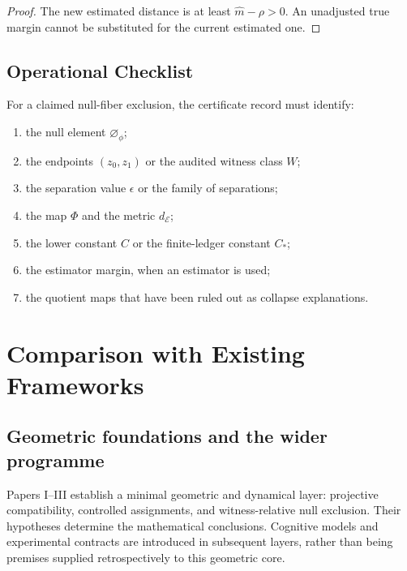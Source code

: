 \documentclass[11pt,a4paper]{article}
\theoremstyle{plain}
\theoremstyle{definition}
\theoremstyle{remark}
\newcommand{\dE}{d_{\mathcal{E}}}
\newcommand{\nullphi}{\varnothing_\phi}
\begin{document}
\begin{proof}
The new estimated distance is at least $\widehat m-\rho>0$. An unadjusted true margin cannot be substituted for the current estimated one.
\end{proof}

\subsection{Operational Checklist}

For a claimed null-fiber exclusion, the certificate record must identify:
\begin{enumerate}
\item the null element $\nullphi$;
\item the endpoints $(z_0,z_1)$ or the audited witness class $W$;
\item the separation value $\epsilon$ or the family of separations;
\item the map $\Phi$ and the metric $\dE$;
\item the lower constant $C$ or the finite-ledger constant $C_*$;
\item the estimator margin, when an estimator is used;
\item the quotient maps that have been ruled out as collapse explanations.
\end{enumerate}

\section{Comparison with Existing Frameworks}

\subsection{Geometric foundations and the wider programme}
Papers I--III establish a minimal geometric and dynamical layer: projective
compatibility, controlled assignments, and witness-relative null exclusion.
Their hypotheses determine the mathematical conclusions. Cognitive models and
experimental contracts are introduced in subsequent layers, rather than
being premises supplied retrospectively to this geometric core.
\end{document}
